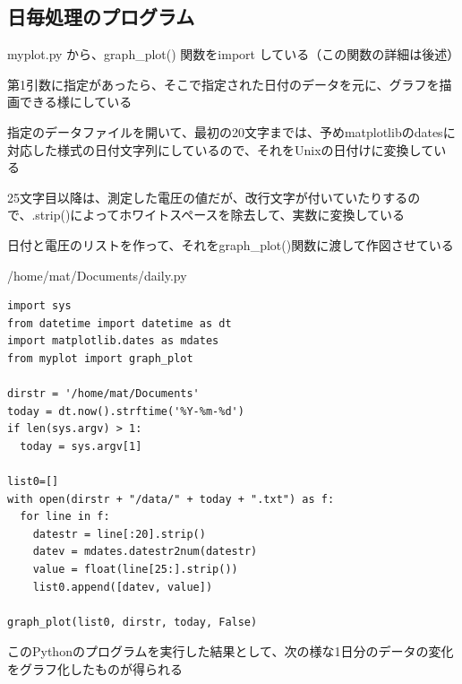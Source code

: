 \documentclass[12pt,a4paper,uplatex]{jsbook}
\begin{document}

\subsection{日毎処理のプログラム}

	myplot.py から、graph\_plot() 関数をimport している（この関数の詳細は後述）
	
	第1引数に指定があったら、そこで指定された日付のデータを元に、グラフを描画できる様にしている
	
	指定のデータファイルを開いて、最初の20文字までは、予めmatplotlibのdatesに対応した様式の日付文字列にしているので、それをUnixの日付けに変換している
	
	25文字目以降は、測定した電圧の値だが、改行文字が付いていたりするので、.strip()によってホワイトスペースを除去して、実数に変換している
	
	日付と電圧のリストを作って、それをgraph\_plot()関数に渡して作図させている

\begin{itembox}[l]{/home/mat/Documents/daily.py}
	\begin{verbatim}
import sys
from datetime import datetime as dt
import matplotlib.dates as mdates
from myplot import graph_plot

dirstr = '/home/mat/Documents'
today = dt.now().strftime('%Y-%m-%d')
if len(sys.argv) > 1:
  today = sys.argv[1]

list0=[]
with open(dirstr + "/data/" + today + ".txt") as f:
  for line in f:
    datestr = line[:20].strip()
    datev = mdates.datestr2num(datestr)
    value = float(line[25:].strip())
    list0.append([datev, value])

graph_plot(list0, dirstr, today, False)
	\end{verbatim}
\end{itembox}

\newpage

このPythonのプログラムを実行した結果として、次の様な1日分のデータの変化をグラフ化したものが得られる%
\end{document}
